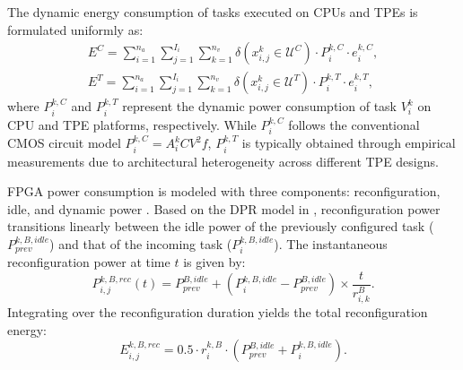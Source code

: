 \documentclass{IEEEtaes}
\begin{document}
The dynamic energy consumption of tasks executed on CPUs and TPEs is formulated uniformly as:
\begin{align}
    E^C = \sum\limits_{i=1}^{n_a} \sum\limits_{j=1}^{I_i} \sum\limits_{k=1}^{n_v} \delta(x_{i,j}^k \in \mathcal{U}^C) \cdot P_i^{k,C} \cdot e_i^{k,C},\\
    E^T = \sum\limits_{i=1}^{n_a} \sum\limits_{j=1}^{I_i} \sum\limits_{k=1}^{n_v} \delta(x_{i,j}^k \in \mathcal{U}^T) \cdot P_i^{k,T} \cdot e_i^{k,T},
\label{equ:CPU_TPE_energy}    
\end{align}
where $P_i^{k,C}$ and $P_i^{k,T}$ represent the dynamic power consumption of task $V_{i}^{k}$ on CPU and TPE platforms, respectively. While $P_i^{k,C}$ follows the conventional CMOS circuit model $P_i^{k,C}=A_{i}^{k}CV^2f$, $P_i^{k,T}$ is typically obtained through empirical measurements due to architectural heterogeneity across different TPE designs.

FPGA power consumption is modeled with three components: reconfiguration, idle, and dynamic power \cite{b2}. Based on the DPR model in \cite{b4}, reconfiguration power transitions linearly between the idle power of the previously configured task ($P_{prev}^{k,B,idle}$) and that of the incoming task ($P_{i}^{k,B,idle}$). The instantaneous reconfiguration power at time $t$ is given by:
\begin{equation}
    P_{i,j}^{k,B,rec}(t)=P_{prev}^{B,idle}+(P_{i}^{k,B,idle}-P_{prev}^{B,idle})\times \frac{t}{r_{i,k}^{B}}.
\end{equation}
Integrating over the reconfiguration duration yields the total reconfiguration energy:
\begin{equation}
    E_{i,j}^{k,B,rec} = 0.5\cdot {r_{i}^{k,B}} \cdot (P_{prev}^{B,idle}+P_{i}^{k,B,idle}).
\end{equation}
\end{document}
